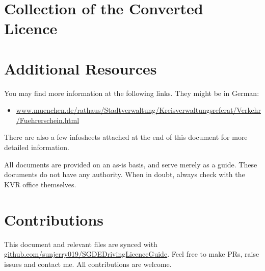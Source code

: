 \documentclass{article}
\begin{document}
\section{Collection of the Converted Licence}
    
\section{Additional Resources}
    You may find more information at the following links. They might be in German:
    \begin{itemize}
        \item \url{www.muenchen.de/rathaus/Stadtverwaltung/Kreisverwaltungsreferat/Verkehr/Fuehrerschein.html}
    \end{itemize}
    
    There are also a few infosheets attached at the end of this document for more detailed information. 
    
    All documents are provided on an as-is basis, and serve merely as a guide. These documents do not have any authority. When in doubt, always check with the KVR office themselves.
    
\section{Contributions}
    This document and relevant files are synced with \url{github.com/sunjerry019/SGDEDrivingLicenceGuide}. Feel free to make PRs, raise issues and contact me. All contributions are welcome.

\pagebreak 



\end{document}
